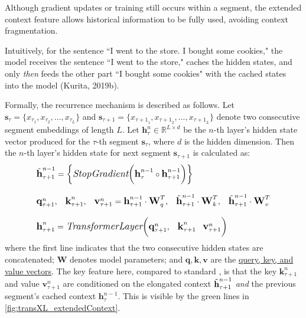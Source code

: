 Although gradient updates or training still occurs within a segment, the extended context feature allows historical information to be fully used, avoiding context fragmentation. 

Intuitively, for the sentence ``I went to the store. I bought some cookies," the model receives the sentence ``I went to the store," caches the hidden states, and only \emph{then} feeds the other part ``I bought some cookies" with the cached states into the model (Kurita, 2019b). 

Formally, the recurrence mechanism is described as follows. Let $\textbf{s}_\tau = \Big\{ x_{\tau_1}, x_{\tau_2}, ..., x_{\tau_L} \Big\}$ and $\textbf{s}_{\tau + 1} = \Big\{ x_{{\tau+1}_1}, x_{{\tau+1}_2}, ..., x_{{\tau+1}_L} \Big\}$ denote two consecutive segment embeddings of length $L$. Let $\textbf{h}_\tau^n \in \mathbb{R}^{L \times d}$ be the $n$-th layer's hidden state vector produced for the $\tau$-th segment $\textbf{s}_\tau$, where $d$ is the hidden dimension. Then the $n$-th layer's hidden state for next segment $\textbf{s}_{\tau + 1}$ is calculated as:
$$
\begin{array}{ll}
\large \Tilde{\textbf{h}}_{\tau + 1}^{n-1} = \Big\{ \textit{StopGradient}\Big( \textbf{h}_\tau^{n-1} \circ \textbf{h}_{\tau+1}^{n-1} \Big) \Big\} \\\\
%
\large \textbf{q}_{\tau+1}^n, \;\;\; \textbf{k}_{\tau+1}^n, \;\;\; \textbf{v}_{\tau+1}^n = \textbf{h}_{\tau+1}^{n-1} \cdot \textbf{W}_q^T, \;\;\; \Tilde{\textbf{h}}_{\tau+1}^{n-1} \cdot \textbf{W}_k^T, \;\;\; \Tilde{\textbf{h}}_{\tau+1}^{n-1} \cdot \textbf{W}_v^T \\\\
%
\large \textbf{h}_{\tau+1}^n = \textit{TransformerLayer} \Big( \textbf{q}_{\tau+1}^n, \;\;\; \textbf{k}_{\tau+1}^n \;\;\; \textbf{v}_{\tau+1}^n \Big)
\end{array}
$$
where the first line indicates that the two consecutive hidden states are concatenated; $\textbf{W}$ denotes model parameters; and $\textbf{q}, \textbf{k}, \textbf{v}$ are the \hyperref[sec:QKV]{query, key, and value vectors}. The key feature here, compared to standard , is that the key $\textbf{k}_{\tau+1}^n$ and value $\textbf{v}_{\tau+1}^n$ are conditioned on the elongated context $\Tilde{\textbf{h}}_{\tau+1}^{n-1}$ \emph{and} the previous segment's cached context $\textbf{h}_\tau^{n-1}$. This is visible by the green lines in \cref{fig:transXL_extendedContext}.  

